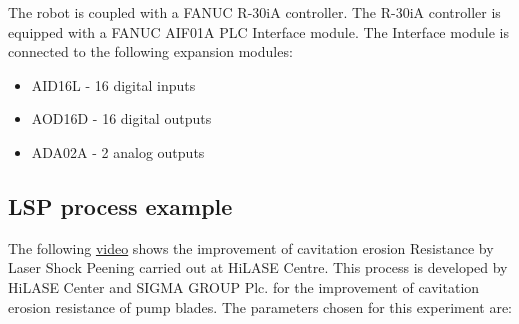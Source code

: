 The robot is coupled with a FANUC R-30iA controller. The R-30iA controller is equipped with a FANUC AIF01A PLC Interface module. The Interface module is connected to the following expansion modules:

\begin{itemize}
    \item AID16L - 16 digital inputs
    \item AOD16D - 16 digital outputs
    \item ADA02A - 2 analog outputs \cite{fanucunitmanual}
\end{itemize}

\subsection{LSP process example}

The following \href{https://www.youtube.com/watch?v=awhlLU91-dk&ab_channel=HiLASECentre}{video} shows the improvement of cavitation erosion Resistance by Laser Shock Peening carried out at HiLASE Centre. This process is developed by HiLASE Center and SIGMA GROUP Plc. for the improvement of cavitation erosion resistance of pump blades. The parameters chosen for this experiment are:

